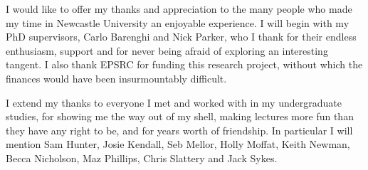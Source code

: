 \begin{acknowledgements}
 I would like to offer my thanks and appreciation to the many people who made my time in Newcastle University an enjoyable experience. I will begin with my PhD supervisors, Carlo Barenghi and Nick Parker, who I thank for their endless enthusiasm, support and for never being afraid of exploring an interesting tangent. I also thank EPSRC for funding this research project, without which the finances would have been insurmountably difficult.

 I extend my thanks to everyone I met and worked with in my undergraduate studies, for showing me the way out of my shell, making lectures more fun than they have any right to be, and for years worth of friendship. In particular I will mention Sam Hunter, Josie Kendall, Seb Mellor, Holly Moffat, Keith Newman, Becca Nicholson, Maz Phillips, Chris Slattery and Jack Sykes.
\end{acknowledgements}
\thispagestyle{empty}
